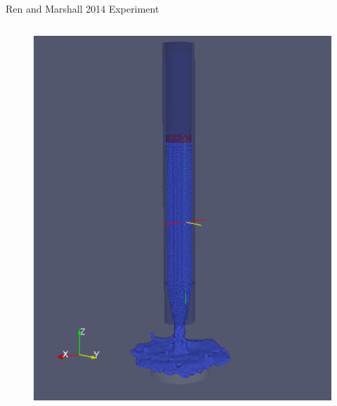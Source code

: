 \begin{frame}{\thesec}{Ren and Marshall 2014 Experiment}
\begin{columns}
\begin{column}{0.45\textwidth}
\begin{figure}
        \includegraphics[width=\textwidth]{img/ren_marshall_mid.png}
      \end{figure}
    \end{column}
  \end{columns}
\end{frame}
